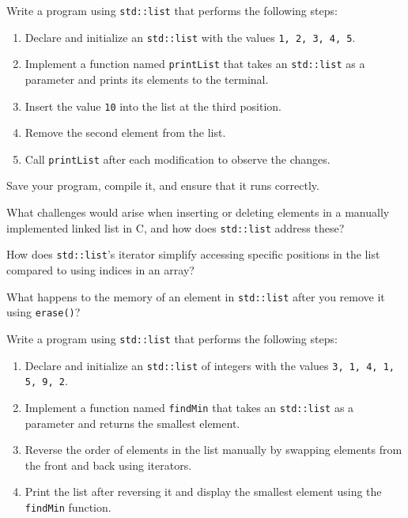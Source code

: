 \begin{challenge}
    \begin{task}
        Write a program using \texttt{std::list} that performs the following steps:
        \begin{enumerate}
            \item Declare and initialize an \texttt{std::list} with the values \texttt{1, 2, 3, 4, 5}.
            \item Implement a function named \texttt{printList} that takes an \texttt{std::list} as a parameter and prints its elements to the terminal.
            \item Insert the value \texttt{10} into the list at the third position.
            \item Remove the second element from the list.
            \item Call \texttt{printList} after each modification to observe the changes.
        \end{enumerate}

        Save your program, compile it, and ensure that it runs correctly.

        \begin{questions}
            \item What challenges would arise when inserting or deleting elements in a manually implemented linked list in C, and how does \texttt{std::list} address these?
            \item How does \texttt{std::list}'s iterator simplify accessing specific positions in the list compared to using indices in an array?
            \item What happens to the memory of an element in \texttt{std::list} after you remove it using \texttt{erase()}?
        \end{questions}
    \end{task}

    \begin{task}
        Write a program using \texttt{std::list} that performs the following steps:
        \begin{enumerate}
            \item Declare and initialize an \texttt{std::list} of integers with the values \texttt{3, 1, 4, 1, 5, 9, 2}.
            \item Implement a function named \texttt{findMin} that takes an \texttt{std::list} as a parameter and returns the smallest element.
            \item Reverse the order of elements in the list manually by swapping elements from the front and back using iterators.
            \item Print the list after reversing it and display the smallest element using the \texttt{findMin} function.
        \end{enumerate}


\end{task}
\end{challenge}
